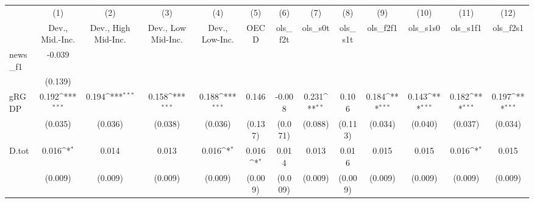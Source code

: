 {
\def\sym#1{\ifmmode^{#1}\else\(^{#1}\)\fi}
\begin{tabular}{l*{12}{c}}
\toprule
            &\multicolumn{1}{c}{(1)}&\multicolumn{1}{c}{(2)}&\multicolumn{1}{c}{(3)}&\multicolumn{1}{c}{(4)}&\multicolumn{1}{c}{(5)}&\multicolumn{1}{c}{(6)}&\multicolumn{1}{c}{(7)}&\multicolumn{1}{c}{(8)}&\multicolumn{1}{c}{(9)}&\multicolumn{1}{c}{(10)}&\multicolumn{1}{c}{(11)}&\multicolumn{1}{c}{(12)}\\
            &\multicolumn{1}{c}{Dev., Mid.-Inc.}&\multicolumn{1}{c}{Dev., High Mid-Inc.}&\multicolumn{1}{c}{Dev., Low Mid-Inc.}&\multicolumn{1}{c}{Dev., Low-Inc.}&\multicolumn{1}{c}{OECD}&\multicolumn{1}{c}{ols\_f2t}&\multicolumn{1}{c}{ols\_s0t}&\multicolumn{1}{c}{ols\_s1t}&\multicolumn{1}{c}{ols\_f2f1}&\multicolumn{1}{c}{ols\_s1s0}&\multicolumn{1}{c}{ols\_s1f1}&\multicolumn{1}{c}{ols\_f2s1}\\
\midrule
news\_f1     &      -0.039         &                     &                     &                     &                     &                     &                     &                     &                     &                     &                     &                     \\
            &     (0.139)         &                     &                     &                     &                     &                     &                     &                     &                     &                     &                     &                     \\
\addlinespace
gRGDP       &       0.192\sym{***}&       0.194\sym{***}&       0.158\sym{***}&       0.188\sym{***}&       0.146         &      -0.008         &       0.231\sym{**} &       0.106         &       0.184\sym{***}&       0.143\sym{***}&       0.182\sym{***}&       0.197\sym{***}\\
            &     (0.035)         &     (0.036)         &     (0.038)         &     (0.036)         &     (0.137)         &     (0.071)         &     (0.088)         &     (0.113)         &     (0.034)         &     (0.040)         &     (0.037)         &     (0.034)         \\
\addlinespace
D.tot       &       0.016\sym{*}  &       0.014         &       0.013         &       0.016\sym{*}  &       0.016\sym{*}  &       0.014         &       0.013         &       0.016         &       0.015         &       0.015         &       0.016\sym{*}  &       0.015         \\
            &     (0.009)         &     (0.009)         &     (0.009)         &     (0.009)         &     (0.009)         &     (0.009)         &     (0.009)         &     (0.009)         &     (0.009)         &     (0.009)         &     (0.009)         &     (0.009)         \\

\end{tabular}}
